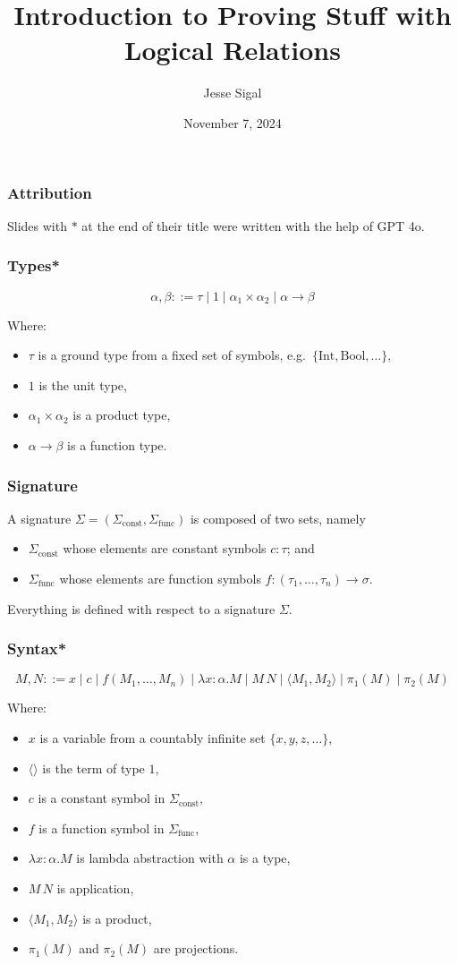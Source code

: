 \documentclass[aspectratio=169]{beamer}
\title{Introduction to Proving Stuff\textsuperscript{\texttrademark} with Logical Relations}
\author{Jesse Sigal}
\date{November 7, 2024}
\begin{document}
\begin{frame}
\titlepage
\end{frame}

\begin{frame}
\frametitle{Attribution}
Slides with $*$ at the end of their title were written with the help of GPT 4o.
\end{frame}

\begin{frame}
\frametitle{Types*}
\[
\alpha, \beta ::= \tau \mid 1 \mid \alpha_1 \times \alpha_2 \mid \alpha \rightarrow \beta
\]

Where:
\begin{itemize}
    \item $\tau$ is a ground type from a fixed set of symbols, e.g.\ $\{\text{Int}, \text{Bool}, \ldots\},$
    \item $1$ is the unit type,
    \item $\alpha_1 \times \alpha_2$ is a product type,
    \item $\alpha \rightarrow \beta$ is a function type.
\end{itemize}
\end{frame}

\begin{frame}
\frametitle{Signature}
A signature $\Sigma = (\Sigma_{\text{const}}, \Sigma_{\text{func}})$ is composed of two sets, namely
\begin{itemize}
    \item $\Sigma_{\text{const}}$ whose elements are constant symbols $c : \tau$; and
    \item $\Sigma_{\text{func}}$ whose elements are function symbols $f : (\tau_1, \ldots, \tau_n) \to \sigma$.
\end{itemize}
Everything is defined with respect to a signature $\Sigma$.

\end{frame}

\begin{frame}
\frametitle{Syntax*}

\[
M, N ::= x \mid c \mid f(M_1, \ldots, M_n) \mid \lambda x: \alpha. M \mid M \, N \mid \langle M_1, M_2 \rangle \mid \pi_1(M) \mid \pi_2(M)
\]

Where:
\begin{itemize}
    \item $x$ is a variable from a countably infinite set $\{x, y, z, \ldots \}$,
    \item $\langle \rangle$ is the term of type $1$,
    \item $c$ is a constant symbol in $\Sigma_{\text{const}}$,
    \item $f$ is a function symbol in $\Sigma_{\text{func}}$,
    \item $\lambda x: \alpha. M$ is lambda abstraction with $\alpha$ is a type,
    \item $M\, N$ is application,
    \item $\langle M_1, M_2 \rangle$ is a product,
    \item $\pi_1(M)$ and $\pi_2(M)$ are projections.
\end{itemize}
\end{frame}
\end{document}

